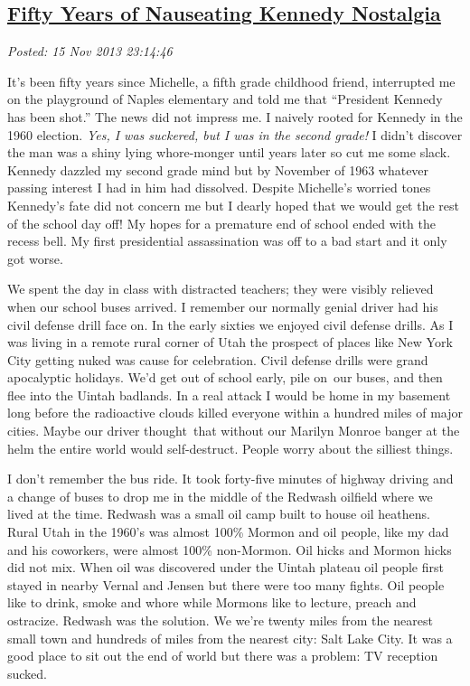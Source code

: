 %

\subsection*{\href{http://bakerjd99.wordpress.com/2013/11/15/fifty-years-of-nauseating-kennedy-nostalgia/}{Fifty Years of Nauseating Kennedy Nostalgia}}


\noindent\emph{Posted: 15 Nov 2013 23:14:46}
\vspace{6pt}

It's been fifty years since Michelle, a fifth grade childhood friend,
interrupted me on the playground of Naples elementary and told me that
``President Kennedy has been shot.'' The news did not impress me. I
naively rooted for Kennedy in the 1960 election. \emph{Yes, I was
suckered, but I was in the second grade!} I didn't discover the man was
a shiny lying whore-monger until years later so cut me some slack.
Kennedy dazzled my second grade mind but by November of 1963 whatever
passing interest I had in him had dissolved. Despite Michelle's worried
tones Kennedy's fate did not concern me but I dearly hoped that we would
get the rest of the school day off! My hopes for a premature end of
school ended with the recess bell. My first presidential assassination was
off to a bad start and it only got worse.

We spent the day in class with distracted teachers; they were visibly
relieved when our school buses arrived. I remember our normally genial
driver had his civil defense drill face on. In the early sixties we
enjoyed civil defense drills. As I was living in a remote rural corner
of Utah the prospect of places like New York City getting nuked was
cause for celebration. Civil defense drills were grand apocalyptic
holidays. We'd get out of school early, pile on~our buses, and then flee
into the Uintah badlands. In a real attack I would be home in my
basement long before the radioactive clouds killed everyone within a
hundred miles of major cities. Maybe our driver thought~that without our
Marilyn Monroe banger at the helm the entire world would self-destruct.
People worry about the silliest things.

I don't remember the bus ride. It took forty-five minutes of highway
driving and a change of buses to drop me in the middle of the Redwash
oilfield where we lived at the time. Redwash was a small oil camp built
to house oil heathens. Rural Utah in the 1960's was almost 100\% Mormon
and oil people, like my dad and his coworkers, were almost 100\%
non-Mormon. Oil hicks and Mormon hicks did not mix. When oil was
discovered under the Uintah plateau oil people first stayed in nearby
Vernal and Jensen but there were too many fights. Oil people like to
drink, smoke and whore while Mormons like to lecture, preach and
ostracize. Redwash was the solution. We we're twenty miles from the
nearest small town and hundreds of miles from the nearest city: Salt
Lake City. It was a good place to sit out the end of world but there was a
problem: TV reception sucked.

